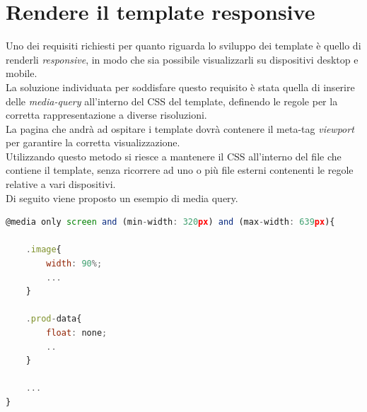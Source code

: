 \section{Rendere il template responsive}
Uno dei requisiti richiesti per quanto riguarda lo sviluppo dei template è quello di renderli \textit{responsive}, in modo che sia possibile visualizzarli su dispositivi desktop e mobile.\\
La soluzione individuata per soddisfare questo requisito è stata quella di inserire delle \textit{media-query} all'interno del CSS del template, definendo le regole per la corretta rappresentazione a diverse risoluzioni.\\
La pagina che andrà ad ospitare i template dovrà contenere il meta-tag \textit{viewport} per garantire la corretta visualizzazione.\\
Utilizzando questo metodo si riesce a mantenere il CSS all'interno del file che contiene il template, senza ricorrere ad uno o più file esterni contenenti le regole relative a vari dispositivi.\\
\newpage
Di seguito viene proposto un esempio di media query.
\begin{lstlisting}[language=JavaScript, caption=Esempio di media query nel CSS del template.]
@media only screen and (min-width: 320px) and (max-width: 639px){

	.image{
		width: 90%;
		...
	}
	
	.prod-data{
		float: none;
		..
	}

	...
}
\end{lstlisting}

